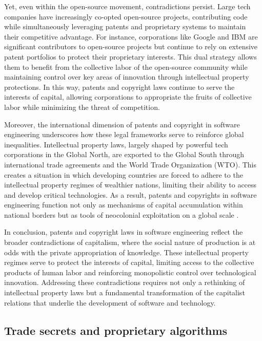 Yet, even within the open-source movement, contradictions persist. Large tech companies have increasingly co-opted open-source projects, contributing code while simultaneously leveraging patents and proprietary systems to maintain their competitive advantage. For instance, corporations like Google and IBM are significant contributors to open-source projects but continue to rely on extensive patent portfolios to protect their proprietary interests. This dual strategy allows them to benefit from the collective labor of the open-source community while maintaining control over key areas of innovation through intellectual property protections. In this way, patents and copyright laws continue to serve the interests of capital, allowing corporations to appropriate the fruits of collective labor while minimizing the threat of competition.

Moreover, the international dimension of patents and copyright in software engineering underscores how these legal frameworks serve to reinforce global inequalities. Intellectual property laws, largely shaped by powerful tech corporations in the Global North, are exported to the Global South through international trade agreements and the World Trade Organization (WTO). This creates a situation in which developing countries are forced to adhere to the intellectual property regimes of wealthier nations, limiting their ability to access and develop critical technologies. As a result, patents and copyrights in software engineering function not only as mechanisms of capital accumulation within national borders but as tools of neocolonial exploitation on a global scale \cite[pp.~53-55]{may2010}.

In conclusion, patents and copyright laws in software engineering reflect the broader contradictions of capitalism, where the social nature of production is at odds with the private appropriation of knowledge. These intellectual property regimes serve to protect the interests of capital, limiting access to the collective products of human labor and reinforcing monopolistic control over technological innovation. Addressing these contradictions requires not only a rethinking of intellectual property laws but a fundamental transformation of the capitalist relations that underlie the development of software and technology.

\subsection{Trade secrets and proprietary algorithms}

